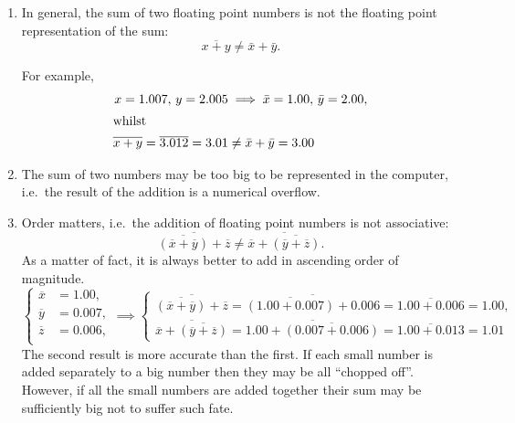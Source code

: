 \begin{enumerate}
\item In general, the sum of two floating point numbers is not the
  floating point representation of the sum:
  \begin{equation*}
    \overline{x+y} \ne \bar x + \bar y. 
  \end{equation*}
  
  For example,
  \begin{align*}
    x = 1.007, \, y = 2.005 &\implies \bar x = 1.00, \,
    \bar y = 2.00, \\
    \intertext{whilst}
    \overline{x+y} = \overline{3.012} = 3.01 & \ne \bar x
    + \bar y = 3.00
  \end{align*} 
\item The sum of two numbers may be too big to be represented in the
  computer, i.e.\ the result of the addition is a numerical overflow.

\item Order matters, i.e.\ the addition of floating point numbers is
  not associative:
  \begin{equation*}
    \overline{\overline{(\overline{x} + \overline{y})} + \overline{z}} \ne
    \overline{\overline{x} + \overline{(\overline{y} + \overline{z})}}.
  \end{equation*}
  As a matter of fact, it is always better to add in ascending order
  of magnitude.
  \begin{equation*}
    \left\{ 
      \begin{aligned}
        \overline{x} &= 1.00, \\
        \overline{y} &= 0.007, \\
        \overline{z} &= 0.006, \\
      \end{aligned}
    \right. \implies 
    \left\{
      \begin{aligned}
        \overline{\overline{(\overline{x} + \overline{y})} +
          \overline{z}} = \overline{\overline{(1.00+0.007)} +
          0.006} =
        \overline{1.00 + 0.006} = 1.00, \\
        \overline{\overline{x} + \overline{( \overline{y} +
            \overline{z} )}} = \overline{ 1.00 +
          \overline{(0.007+0.006)}} = \overline{1.00 + 0.013} =
        1.01
      \end{aligned}
    \right.
  \end{equation*}
  The second result is more accurate than the first.  If each small
  number is added separately to a big number then they may be all
  ``chopped off''.  However, if all the small numbers are added
  together their sum may be sufficiently big not to suffer such fate.

\end{enumerate}

